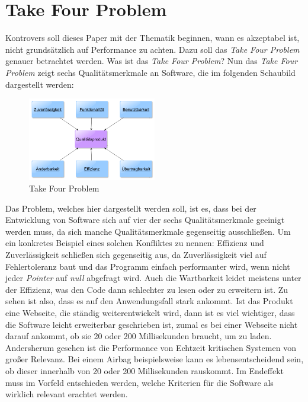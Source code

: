 \section{Take Four Problem}\label{sec:takeforproblem}
Kontrovers soll dieses Paper mit der Thematik beginnen, wann es akzeptabel ist, nicht
grundsätzlich auf Performance zu achten. Dazu soll das \emph{Take Four Problem} genauer
betrachtet werden. Was ist das \emph{Take Four Problem}? Nun das \emph{Take Four Problem} zeigt
sechs Qualitätsmerkmale an Software, die im folgenden Schaubild dargestellt werden:

\begin{figure}[h]
    \centering
    \includegraphics[width=0.5\textwidth]{bilder/ISO3}
    \caption[T4P]{Take Four Problem}
    \label{img:T4P}
\end{figure}

Das Problem, welches hier dargestellt werden soll, ist es, dass bei der Entwicklung von Software
sich auf vier der sechs Qualitätsmerkmale geeinigt werden muss, da sich manche Qualitätsmerkmale
gegenseitig ausschließen. Um ein konkretes Beispiel eines solchen Konfliktes zu nennen: Effizienz
und Zuverlässigkeit schließen sich gegenseitig aus, da Zuverlässigkeit viel auf Fehlertoleranz
baut und das Programm einfach performanter wird, wenn nicht jeder \emph{Pointer} auf \emph{null}
abgefragt wird. Auch die Wartbarkeit leidet meistens unter der Effizienz, was den Code dann schlechter zu lesen oder zu erweitern ist.
\newline
\newline
Zu sehen ist also, dass es auf den Anwendungsfall stark ankommt. Ist das Produkt eine Webseite,
die ständig weiterentwickelt wird, dann ist es viel wichtiger, dass die Software leicht
erweiterbar geschrieben ist, zumal es bei einer Webseite nicht darauf ankommt, ob sie 20 oder 200
Millisekunden braucht, um zu laden.
\newline
\newline
Andersherum gesehen ist die Performance von Echtzeit kritischen Systemen von großer Relevanz. Bei
einem Airbag beispielsweise kann es lebensentscheidend sein, ob dieser innerhalb von 20 oder 200
Millisekunden rauskommt. Im Endeffekt muss im Vorfeld entschieden werden, welche Kriterien für
die Software als wirklich relevant erachtet werden.